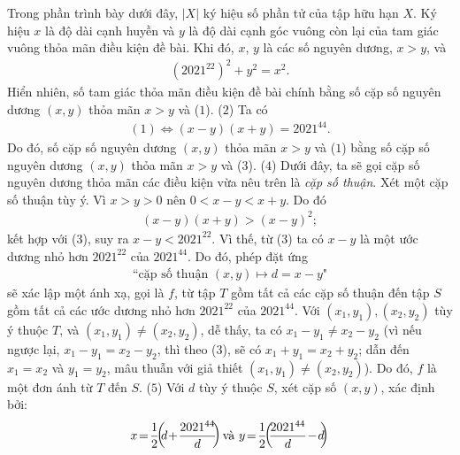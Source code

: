 \begin{multicols}{2}
	\vskip 0.05cm
	Trong phần trình bày dưới đây, $|X|$ ký hiệu số phần tử của tập hữu hạn $X$.
	\vskip 0.05cm
	Ký hiệu $x$ là độ dài cạnh huyền và $y$ là độ dài cạnh góc vuông còn lại của tam giác vuông thỏa mãn điều kiện đề bài. Khi đó, $x$, $y$ là các số nguyên dương, $x > y$, và
	\begin{align*}
		{\left( {{{2021}^{22}}} \right)^2} + {y^2} = {x^2}. \tag{$1$}
	\end{align*}
	Hiển nhiên, số tam giác thỏa mãn điều kiện đề bài chính bằng số cặp số nguyên dương $(x, y)$ thỏa mãn $x > y$ và ($1$). \hfill ($2$)
	\vskip 0.05cm
	Ta có
	\begin{align*}
		(1) \Leftrightarrow \left( {x - y} \right)\left( {x + y} \right) = {2021^{44}}. \tag{$3$}
	\end{align*}
	Do đó, số cặp số nguyên dương $(x, y)$ thỏa mãn $x > y$ và ($1$) bằng số cặp số nguyên dương $(x, y)$ thỏa mãn $x > y$ và ($3$). \hfill ($4$)
	\vskip 0.05cm
	Dưới đây, ta sẽ gọi cặp số nguyên dương thỏa mãn các điều kiện vừa nêu trên là \textit{cặp số thuận}.
	\vskip 0.05cm
	Xét một cặp số thuận tùy ý. Vì $x > y > 0$ nên  $0 < x - y < x + y$. Do đó
	\begin{align*}
		\left( {x - y} \right)\left( {x + y} \right) > {\left( {x - y} \right)^2};
	\end{align*}
	kết hợp với ($3$), suy ra $x - y < 2021^{22}$. Vì thế, từ ($3$) ta có $x - y$ là một ước dương nhỏ hơn $2021^{22}$  của $2021^{44}$. Do đó, phép đặt ứng
	\begin{align*}
		\text{``cặp số thuận } (x, y) \mapsto   d = x - y\text{"}
	\end{align*}
	sẽ xác lập một ánh xạ, gọi là $f$, từ tập $T$ gồm tất cả các cặp số thuận đến tập $S$ gồm tất cả các ước dương nhỏ hơn $2021^{22}$  của $2021^{44}$.
	\vskip 0.05cm 
	Với $\left( {{x_1},{y_1}} \right),\left( {{x_2},{y_2}} \right)$  tùy ý thuộc $T$, và $\left( {{x_1},{y_1}} \right) \ne \left( {{x_2},{y_2}} \right)$, dễ thấy, ta có ${x_1} - {y_1} \ne {x_2} - {y_2}$  (vì nếu ngược lại,  ${x_1} - {y_1} = {x_2} - {y_2}$, thì theo ($3$), sẽ có  ${x_1} + {y_1} = {x_2} + {y_2}$; dẫn đến $x_1 = x_2$  và  $y_1 = y_2$, mâu thuẫn với giả thiết  $\left( {{x_1},{y_1}} \right) \ne \left( {{x_2},{y_2}} \right)$). Do đó,  $f$ là một đơn ánh từ $T$ đến $S$. \hfill  ($5$)
	\vskip 0.05cm
	Với $d$ tùy ý thuộc $S$, xét cặp số $(x, y)$, xác định bởi:
	\begin{align*}
		x \!=\! \frac{1}{2}\!\!\left(\!\! {d \!+\! \frac{{{{2021}^{44}}}}{d}} \!\!\right) \text{\color{black} và } y \!=\! \frac{1}{2}\!\!\left(\!\! {\frac{{{{2021}^{44}}}}{d} \!-\! d}\!\! \right)

\end{align*}
\end{multicols}
